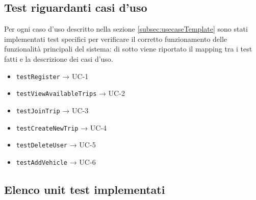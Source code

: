 \subsection{Test riguardanti casi d'uso}
Per ogni caso d'uso descritto nella sezione \ref{subsec:usecaseTemplate} sono stati implementati test specifici per verificare il corretto funzionamento delle funzionalità principali del sistema: di sotto viene riportato il mapping tra i test fatti e la descrizione dei casi d'uso.
\begin{itemize}
    \item \texttt{testRegister} → UC-1
    \item \texttt{testViewAvailableTrips} → UC-2
    \item \texttt{testJoinTrip} → UC-3
    \item \texttt{testCreateNewTrip} → UC-4
    \item \texttt{testDeleteUser} → UC-5
    \item \texttt{testAddVehicle} → UC-6
\end{itemize}
\subsection{Elenco unit test implementati}
